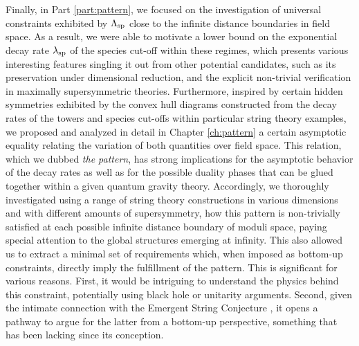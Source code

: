 
Finally, in Part \ref{part:pattern}, we focused on the investigation of universal constraints exhibited by $\Lambda_{\text{sp}}$ close to the infinite distance boundaries in field space. As a result, we were able to motivate a lower bound on the exponential decay rate $\lambda_{\rm sp}$ of the species cut-off within these regimes, which presents various interesting features singling it out from other potential candidates, such as its preservation under dimensional reduction, and the explicit non-trivial verification in maximally supersymmetric theories. Furthermore, inspired by certain hidden symmetries exhibited by the convex hull diagrams constructed from the decay rates of the towers and species cut-offs within particular string theory examples, we proposed and analyzed in detail in Chapter \ref{ch:pattern} a certain asymptotic equality relating the variation of both quantities over field space. This relation, which we dubbed \emph{the pattern}, has strong implications for the asymptotic behavior of the decay rates as well as for the possible duality phases that can be glued together within a given quantum gravity theory. Accordingly, we thoroughly investigated using a range of string theory constructions in various dimensions and with different amounts of supersymmetry, how this pattern is non-trivially satisfied at each possible infinite distance boundary of moduli space, paying special attention to the global structures emerging at infinity. This also allowed us to extract a minimal set of requirements which, when imposed as bottom-up constraints, directly imply the fulfillment of the pattern. This is significant for various reasons. First, it would be intriguing to understand the physics behind this constraint, potentially using black hole or unitarity arguments. Second, given the intimate connection with the Emergent String Conjecture \cite{Lee:2019wij}, it opens a pathway to argue for the latter from a bottom-up perspective, something that has been lacking since its conception.

